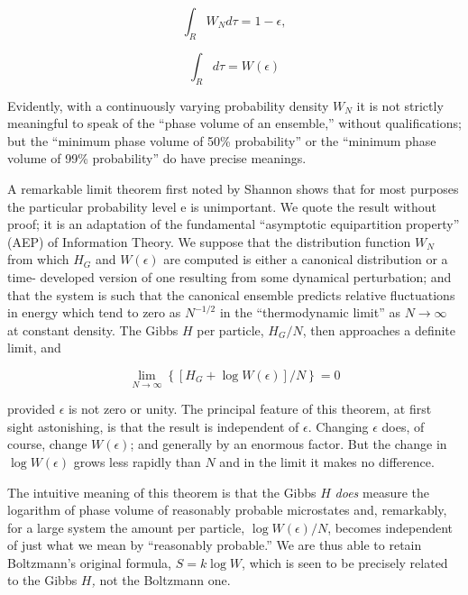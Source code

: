 \documentclass[twocolumn]{article}
\begin{document}
\[
\int_{R}W_{N} d\tau = 1 - \epsilon,
\]

\[
\int_{R} d\tau = W(\epsilon)
\]

Evidently, with a continuously varying probability density \(W_{N}\) it
is not strictly meaningful to speak of the ``phase volume of an
ensemble,'' without qualifications; but the ``minimum phase volume of
50\% probability'' or the ``minimum phase volume of 99\% probability''
do have precise meanings.

\nocite{Jaynes-information57}
A remarkable limit theorem first noted by Shannon \cite[][(see, particularly, Sec. 21)]{Shannon-mathematical48} 
shows that for most purposes the particular probability level e is
unimportant. We quote the result without proof; it is an adaptation of
the fundamental ``asymptotic equipartition property'' (AEP) of
Information Theory.\cite[][(See Chapter 6)]{Feinstein-foundations58} We suppose that the distribution function \(W_{N}\) from
which \(H_{G}\) and \(W\left( \epsilon \right)\) are computed is either
a canonical distribution or a time- developed version of one resulting
from some dynamical perturbation; and that the system is such that the
canonical ensemble predicts relative fluctuations in energy which tend
to zero as \(N^{- 1/2}\) in the ``thermodynamic limit'' as
\(N \rightarrow \infty\) at constant density. The Gibbs \(H\) per
particle, \(H_{G}/N\), then approaches a definite limit, and

\begin{equation}
\lim_{N \rightarrow \infty}\left\{ \left\lbrack H_{G} + \log{W(\epsilon)} \right\rbrack/N \right\} = 0
\label{eqn-eighteen}
\end{equation}

provided \(\epsilon\) is not zero or unity. The principal feature of
this theorem, at first sight astonishing, is that the result is
independent of \(\epsilon\). Changing \(\epsilon\) does, of course,
change \(W\left( \epsilon \right)\); and generally by an enormous
factor. But the change in \(\log{W(\epsilon)}\) grows less rapidly than
\(N\) and in the limit it makes no difference.

The intuitive meaning of this theorem is that the Gibbs \(H\)
\emph{does} measure the logarithm of phase volume of reasonably probable
microstates and, remarkably, for a large system the amount per particle,
\(\log{W(\epsilon)/N}\), becomes independent of just what we mean by
``reasonably probable.'' We are thus able to retain Boltzmann's original
formula, \(S = k\log W\), which is seen to be precisely related to the
Gibbs \(H\)\emph{\textsc{,}} not the Boltzmann one.
\end{document}
